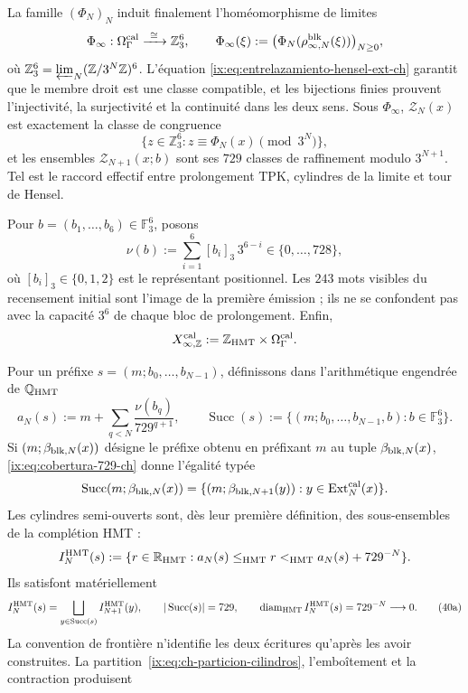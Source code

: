 La famille \((\Phi_N)_N\) induit finalement l’homéomorphisme de limites
\begin{equation}
 \Phi_\infty:\Omega_\Gamma^{\rm cal}
 \xrightarrow{\ \cong\ }\mathbb Z_3^6,\qquad
 \Phi_\infty(\xi):=
 \bigl(\Phi_N(\rho^{\rm blk}_{\infty,N}(\xi))\bigr)_{N\ge0},
 \label{ix:eq:phi-infinito-hensel-ext-ch}
\end{equation}
où
\(\mathbb Z_3^6=\varprojlim_N(\mathbb Z/3^N\mathbb Z)^6\).
L’équation \eqref{ix:eq:entrelazamiento-hensel-ext-ch} garantit que le membre
droit est une classe compatible, et les bijections finies prouvent
l’injectivité, la surjectivité et la continuité dans les deux sens. Sous
\(\Phi_\infty\), \(\mathscr Z_N(x)\) est exactement la classe de congruence
\[
 \{z\in\mathbb Z_3^6:z\equiv\Phi_N(x)\pmod{3^N}\},
\]
et les ensembles \(\mathscr Z_{N+1}(x;b)\) sont ses \(729\) classes de raffinement
modulo \(3^{N+1}\). Tel est le raccord effectif entre prolongement TPK,
cylindres de la limite et tour de Hensel.

Pour \(b=(b_1,\ldots,b_6)\in\mathbb F_3^6\), posons
\[
 \nu(b):=\sum_{i=1}^{6}[b_i]_3\,3^{6-i}
 \in\{0,\ldots,728\},
\tag{40c$_0$}
\label{ix:eq:valor-bloque-ch}
\]
où \([b_i]_3\in\{0,1,2\}\) est le représentant positionnel. Les
\(243\) mots visibles du recensement initial sont l’image de la première
émission ; ils ne se confondent pas avec la capacité \(3^6\) de chaque bloc de
prolongement. Enfin,
\[
 X_{\infty,\mathbb Z}^{\rm cal}
 :=\mathbb Z_{\rm HMT}\times\Omega_\Gamma^{\rm cal}.
\]



Pour un préfixe \(s=(m;b_0,\ldots,b_{N-1})\), définissons dans l’arithmétique
engendrée de \(\mathbb Q_{\rm HMT}\)
\[
 a_N(s):=m+\sum_{q<N}\frac{\nu(b_q)}{729^{q+1}},
 \qquad
 \operatorname{Succ}(s):=
 \{(m;b_0,\ldots,b_{N-1},b):b\in\mathbb F_3^6\}.
\]
Si \((m;\beta_{{\rm blk},N}(x))\) désigne le préfixe obtenu en préfixant
\(m\) au tuple \(\beta_{{\rm blk},N}(x)\),
\eqref{ix:eq:cobertura-729-ch} donne l’égalité typée
\[
 \operatorname{Succ}(m;\beta_{{\rm blk},N}(x))
 =\{(m;\beta_{{\rm blk},N+1}(y)):
       y\in\operatorname{Ext}^{\rm cal}_N(x)\}.
\]
Les cylindres semi-ouverts sont, dès leur première définition, des sous-ensembles de
la complétion HMT :
\[
 I_N^{\rm HMT}(s):=
 \{r\in\mathbb R_{\rm HMT}:
      a_N(s)\le_{\rm HMT}r<_{\rm HMT}a_N(s)+729^{-N}\}.
\]
Ils satisfont matériellement
\[
 I_N^{\rm HMT}(s)=
 \bigsqcup_{y\in\operatorname{Succ}(s)}I_{N+1}^{\rm HMT}(y),
 \qquad |\operatorname{Succ}(s)|=729,
 \qquad \operatorname{diam}_{\rm HMT}I_N^{\rm HMT}(s)
      =729^{-N}\longrightarrow0.
\tag{40a}\label{ix:eq:ch-particion-cilindros}
\]
La convention de frontière n’identifie les deux écritures qu’après
les avoir construites. La partition~\eqref{ix:eq:ch-particion-cilindros}, l’emboîtement et la contraction produisent

